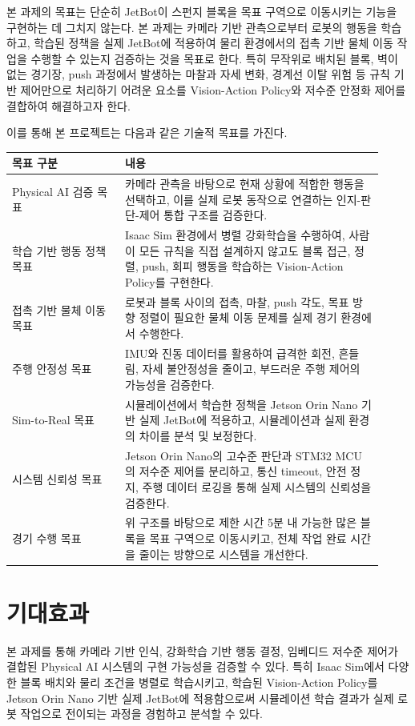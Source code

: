 \documentclass[titlepage]{pnureport}
\begin{document}
본 과제의 목표는 단순히 JetBot이 스펀지 블록을 목표 구역으로 이동시키는 기능을 구현하는 데 그치지 않는다. 본 과제는 카메라 기반 관측으로부터 로봇의 행동을 학습하고, 학습된 정책을 실제 JetBot에 적용하여 물리 환경에서의 접촉 기반 물체 이동 작업을 수행할 수 있는지 검증하는 것을 목표로 한다. 특히 무작위로 배치된 블록, 벽이 없는 경기장, push 과정에서 발생하는 마찰과 자세 변화, 경계선 이탈 위험 등 규칙 기반 제어만으로 처리하기 어려운 요소를 Vision-Action Policy와 저수준 안정화 제어를 결합하여 해결하고자 한다.

이를 통해 본 프로젝트는 다음과 같은 기술적 목표를 가진다.

\begin{longtable}{p{0.28\linewidth}p{0.64\linewidth}}
\toprule
목표 구분 & 내용 \\
\midrule
\endhead
Physical AI 검증 목표 & 카메라 관측을 바탕으로 현재 상황에 적합한 행동을 선택하고, 이를 실제 로봇 동작으로 연결하는 인지-판단-제어 통합 구조를 검증한다. \\
학습 기반 행동 정책 목표 & Isaac Sim 환경에서 병렬 강화학습을 수행하여, 사람이 모든 규칙을 직접 설계하지 않고도 블록 접근, 정렬, push, 회피 행동을 학습하는 Vision-Action Policy를 구현한다. \\
접촉 기반 물체 이동 목표 & 로봇과 블록 사이의 접촉, 마찰, push 각도, 목표 방향 정렬이 필요한 물체 이동 문제를 실제 경기 환경에서 수행한다. \\
주행 안정성 목표 & IMU와 진동 데이터를 활용하여 급격한 회전, 흔들림, 자세 불안정성을 줄이고, 부드러운 주행 제어의 가능성을 검증한다. \\
Sim-to-Real 목표 & 시뮬레이션에서 학습한 정책을 Jetson Orin Nano 기반 실제 JetBot에 적용하고, 시뮬레이션과 실제 환경의 차이를 분석 및 보정한다. \\
시스템 신뢰성 목표 & Jetson Orin Nano의 고수준 판단과 STM32 MCU의 저수준 제어를 분리하고, 통신 timeout, 안전 정지, 주행 데이터 로깅을 통해 실제 시스템의 신뢰성을 검증한다. \\
경기 수행 목표 & 위 구조를 바탕으로 제한 시간 5분 내 가능한 많은 블록을 목표 구역으로 이동시키고, 전체 작업 완료 시간을 줄이는 방향으로 시스템을 개선한다. \\
\bottomrule
\end{longtable}

\section{기대효과}

본 과제를 통해 카메라 기반 인식, 강화학습 기반 행동 결정, 임베디드 저수준 제어가 결합된 Physical AI 시스템의 구현 가능성을 검증할 수 있다. 특히 Isaac Sim에서 다양한 블록 배치와 물리 조건을 병렬로 학습시키고, 학습된 Vision-Action Policy를 Jetson Orin Nano 기반 실제 JetBot에 적용함으로써 시뮬레이션 학습 결과가 실제 로봇 작업으로 전이되는 과정을 경험하고 분석할 수 있다.
\end{document}
